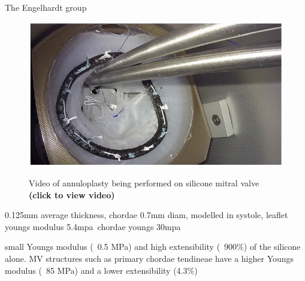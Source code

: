 The Engelhardt group 
\begin{figure}[H]
    \centering
    \href{https://link.springer.com/article/10.1007/s11548-019-01971-9#MOESM1}{\includegraphics[width=\linewidth]{figures/Engel}}%
    \caption{Video of annuloplasty being performed on silicone mitral valve \textbf{(click to view video)}}
    \label{fig:Videoengel}
\end{figure}

\newthought{}

0.125mm average thickness, chordae 0.7mm diam, modelled in systole, leaflet youngs modulus 5.4mpa\ chordae youngs 30mpa

small Youngs modulus (~0.5 MPa) and high extensibility (~900\%) of the silicone alone. MV structures such as primary chordae tendineae have a higher Youngs modulus (~85 MPa) and a lower extensibility (4.3\%)





